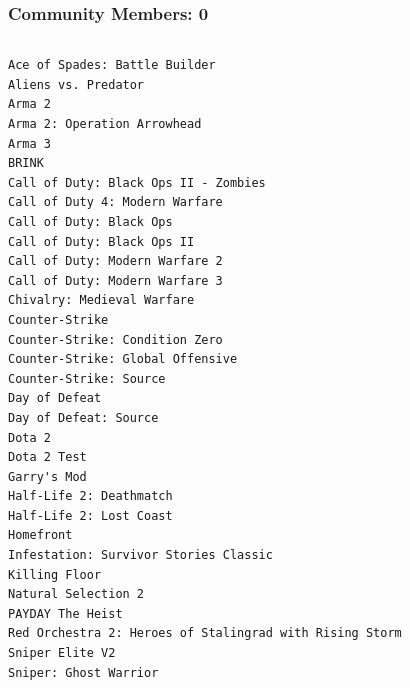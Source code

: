 \documentclass[18pt,xcolor=table]{beamer} \usefonttheme[onlymath]{serif}
\begin{document}
\begin{frame}[fragile]
  \frametitle{Community Members: 0}
  \centering
{\tiny
\begin{columns}[T]
\begin{lstlisting}
Ace of Spades: Battle Builder
Aliens vs. Predator
Arma 2
Arma 2: Operation Arrowhead
Arma 3
BRINK
Call of Duty: Black Ops II - Zombies
Call of Duty 4: Modern Warfare
Call of Duty: Black Ops
Call of Duty: Black Ops II
Call of Duty: Modern Warfare 2
Call of Duty: Modern Warfare 3
Chivalry: Medieval Warfare
Counter-Strike
Counter-Strike: Condition Zero
Counter-Strike: Global Offensive
Counter-Strike: Source
Day of Defeat
Day of Defeat: Source
Dota 2
Dota 2 Test
Garry's Mod
Half-Life 2: Deathmatch
Half-Life 2: Lost Coast
Homefront
Infestation: Survivor Stories Classic
Killing Floor
Natural Selection 2
PAYDAY The Heist
Red Orchestra 2: Heroes of Stalingrad with Rising Storm
Sniper Elite V2
Sniper: Ghost Warrior
\end{lstlisting}
\end{columns}
} %
\end{frame}
\end{document}
